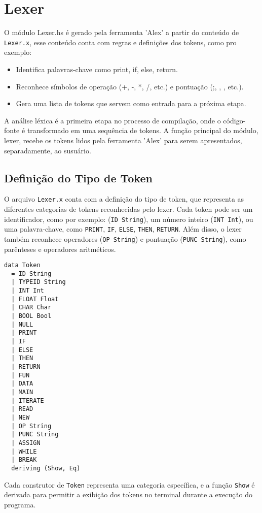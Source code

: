 \documentclass{article}
\begin{document}
\section{Lexer}
O módulo Lexer.hs é gerado pela ferramenta 'Alex' a partir do conteúdo de \texttt{Lexer.x}, esse conteúdo conta com regras e definições dos tokens, como pro exemplo:
\begin{itemize}
    \item Identifica palavras-chave como print, if, else, return. 
    \item Reconhece símbolos de operação (+, -, *, /, etc.) e pontuação (;, {, }, etc.). 
    \item Gera uma lista de tokens que servem como entrada para a próxima etapa. 
\end{itemize}

A análise léxica é a primeira etapa no processo de compilação, onde o código-fonte é transformado em uma sequência de tokens. A função principal do módulo, lexer, recebe os tokens lidos pela ferramenta 'Alex' para serem apresentados, separadamente, ao susuário.

\subsection{Definição do Tipo de Token}

O arquivo \texttt{Lexer.x} conta com a definição do tipo de token, que representa as diferentes categorias de tokens reconhecidas pelo lexer. Cada token pode ser um identificador, como por exemplo: (\texttt{ID String}), um número inteiro (\texttt{INT Int}), ou uma palavra-chave, como \texttt{PRINT}, \texttt{IF}, \texttt{ELSE}, \texttt{THEN}, \texttt{RETURN}. Além disso, o lexer também reconhece operadores (\texttt{OP String}) e pontuação (\texttt{PUNC String}), como parênteses e operadores aritméticos.

\begin{verbatim}
data Token
  = ID String
  | TYPEID String
  | INT Int
  | FLOAT Float
  | CHAR Char
  | BOOL Bool
  | NULL
  | PRINT
  | IF
  | ELSE
  | THEN
  | RETURN
  | FUN
  | DATA
  | MAIN
  | ITERATE
  | READ
  | NEW
  | OP String
  | PUNC String
  | ASSIGN
  | WHILE
  | BREAK
  deriving (Show, Eq)
\end{verbatim}

Cada construtor de \texttt{Token} representa uma categoria específica, e a função \texttt{Show} é derivada para permitir a exibição dos tokens no terminal durante a execução do programa.
\end{document}
